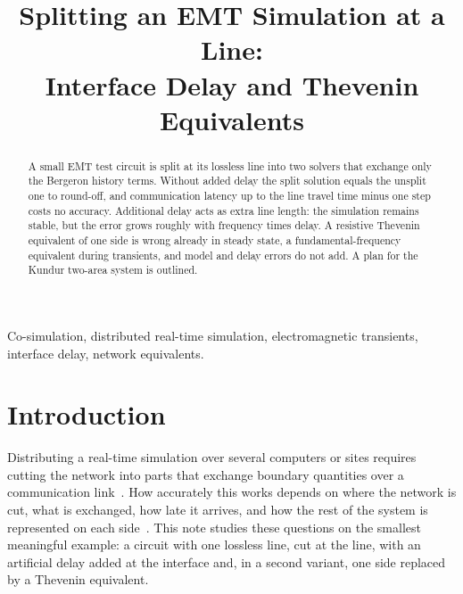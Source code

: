 \documentclass[conference]{IEEEtran}
\begin{document}
\title{Splitting an EMT Simulation at a Line:\\Interface Delay and Thevenin Equivalents}
\author{
}
\maketitle

\begin{abstract}
A small EMT test circuit is split at its lossless line into two solvers that exchange only the Bergeron history terms. Without added delay the split solution equals the unsplit one to round-off, and communication latency up to the line travel time minus one step costs no accuracy. Additional delay acts as extra line length: the simulation remains stable, but the error grows roughly with frequency times delay. A resistive Thevenin equivalent of one side is wrong already in steady state, a fundamental-frequency equivalent during transients, and model and delay errors do not add. A plan for the Kundur two-area system is outlined.
\end{abstract}
\begin{IEEEkeywords}
Co-simulation, distributed real-time simulation, electromagnetic transients, interface delay, network equivalents.
\end{IEEEkeywords}

\section{Introduction}
Distributing a real-time simulation over several computers or sites requires cutting the network into parts that exchange boundary quantities over a communication link~\cite{syed,stevic}. How accurately this works depends on where the network is cut, what is exchanged, how late it arrives, and how the rest of the system is represented on each side~\cite{ren2011,ren2008}. This note studies these questions on the smallest meaningful example: a circuit with one lossless line, cut at the line, with an artificial delay added at the interface and, in a second variant, one side replaced by a Thevenin equivalent.
\end{document}
